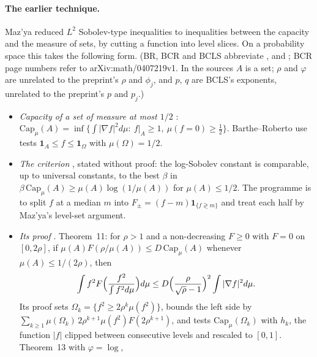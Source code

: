 \documentclass[11pt]{article}
\newcommand{\one}{\mathbf{1}}
\newcommand{\sloc}[2]{\cite[#2]{#1}}
\begin{document}
\paragraph{The earlier technique.}
Maz'ya \cite{NL-Mazya1985} reduced $L^2$ Sobolev-type inequalities to
inequalities between the capacity and the measure of sets, by cutting a
function into level slices. On a probability space this takes the following
form. (BR, BCR and BCLS abbreviate
\cite{BartheRoberto2003-SobolevInequalitiesRealLine},
\cite{BartheEtAl2004-InterpolatedInequalitiesOrliczIsoperimetry} and
\cite{BakryEtAl1995-SobolevInequalitiesInDisguise}; BCR page numbers refer to
arXiv:math/0407219v1. In the sources $A$ is a set; $\rho$ and $\varphi$ are
unrelated to the preprint's $\rho$ and $\phi_j$, and $p$, $q$ are BCLS's
exponents, unrelated to the preprint's $p$ and $p_j$.)
\begin{itemize}
\item \emph{Capacity of a set of measure at most $1/2$}
 \sloc{BartheEtAl2004-InterpolatedInequalitiesOrliczIsoperimetry}{\S5.2,
 pp.~30--31}:
 $\mathrm{Cap}_\mu(A)=\inf\{\int|\nabla f|^2d\mu:\ f|_A\ge1,\ \mu(f=0)\ge\frac12\}$.
 Barthe--Roberto \sloc{BartheRoberto2003-SobolevInequalitiesRealLine}{\S4,
 remark~6), p.~496} use tests $\one_A\le f\le\one_\Omega$ with $\mu(\Omega)=1/2$.
\item \emph{The criterion}
 \sloc{BartheRoberto2003-SobolevInequalitiesRealLine}{remark~6), pp.~495--496},
 stated without proof: the log-Sobolev constant is comparable, up to universal
 constants, to the best $\beta$ in
 $\beta\,\mathrm{Cap}_\mu(A)\ge\mu(A)\log(1/\mu(A))$ for $\mu(A)\le1/2$. The
 programme is to split $f$ at a median $m$ into
 $F_\pm=(f-m)\one_{\{f\gtrless m\}}$ and treat each half by Maz'ya's
 level-set argument.
\item \emph{Its proof}
 \sloc{BartheEtAl2004-InterpolatedInequalitiesOrliczIsoperimetry}{Thm~11,
 pp.~38--39; Thm~13, p.~45; Rem.~19, pp.~46--47}. Theorem~11: for $\rho>1$ and
 a non-decreasing $F\ge0$ with $F=0$ on $[0,2\rho]$, if
 $\mu(A)F(\rho/\mu(A))\le D\,\mathrm{Cap}_\mu(A)$ whenever
 $\mu(A)\le1/(2\rho)$, then
 \[
 \int f^2F\Bigl(\frac{f^2}{\int f^2d\mu}\Bigr)d\mu\le D\Bigl(\frac{\rho}{\sqrt\rho-1}\Bigr)^2\int|\nabla f|^2d\mu .
 \]
 Its proof sets $\Omega_k=\{f^2\ge2\rho^k\mu(f^2)\}$, bounds the left side by
 $\sum_{k\ge1}\mu(\Omega_k)\,2\rho^{k+1}\mu(f^2)F(2\rho^{k+1})$, and tests
 $\mathrm{Cap}_\mu(\Omega_k)$ with $h_k$, the function $|f|$ clipped between
 consecutive levels and rescaled to $[0,1]$. Theorem~13 with $\varphi=\log$,

\end{itemize}
\end{document}

